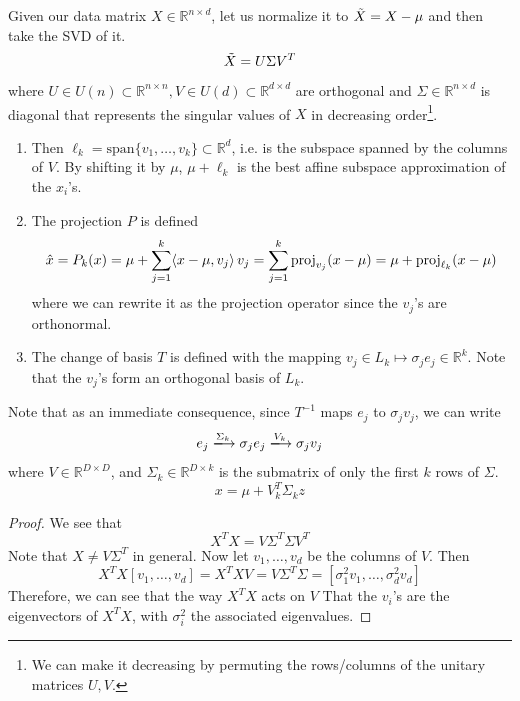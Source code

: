     \begin{theorem}
      Given our data matrix $X \in \mathbb{R}^{n \times d}$, let us normalize it to $\Tilde{X} = X - \mu$ and then take the SVD of it. 
      \begin{equation}
        \Tilde{X} = U \Sigma V^T
      \end{equation}
      where $U \in U(n) \subset \mathbb{R}^{n \times n}, V \in U(d) \subset \mathbb{R}^{d \times d}$ are orthogonal and $\Sigma \in \mathbb{R}^{n \times d}$ is diagonal that represents the singular values of $X$ in decreasing order\footnote{We can make it decreasing by permuting the rows/columns of the unitary matrices $U, V$.}. 
      \begin{enumerate}
        \item Then $\ell_k = \mathrm{span}\{v_1, \ldots, v_k\} \subset \mathbb{R}^d$, i.e. is the subspace spanned by the columns of $V$. By shifting it by $\mu$, $\mu + \ell_k$ is the best affine subspace approximation of the $x_i$'s. 

        \item The projection $P$ is defined 
        \begin{equation}
          \hat{x} = P_k (x) = \mu + \sum_{j=1}^k \langle x - \mu, v_j \rangle \, v_j = \sum_{j=1}^k \operatorname{proj}_{v_j} (x - \mu) = \mu + \operatorname{proj}_{\ell_k} (x - \mu)
        \end{equation}
        where we can rewrite it as the projection operator since the $v_j$'s are orthonormal. 

        \item The change of basis $T$ is defined with the mapping $v_j \in L_k \mapsto \sigma_j e_j \in \mathbb{R}^k$. Note that the $v_j$'s form an orthogonal basis of $L_k$. 
      \end{enumerate} 
      Note that as an immediate consequence, since $T^{-1}$ maps $e_j$ to $\sigma_j v_j$, we can write 
      \begin{equation}
        e_j \xlongrightarrow{\Sigma_k} \sigma_j e_j \xlongrightarrow{V_k} \sigma_j v_j
      \end{equation}
      where $V \in \mathbb{R}^{D \times D}$, and $\Sigma_k \in \mathbb{R}^{D \times k}$ is the submatrix of only the first $k$ rows of $\Sigma$. 
      \begin{equation}
        x = \mu + V_k^T \Sigma_k z
      \end{equation}
    \end{theorem}
    \begin{proof}
      We see that 
      \begin{equation}
        X^T X =  V \Sigma^T \Sigma V^T
      \end{equation}
      Note that $X \neq V \Sigma^T$ in general. Now let $v_1, \ldots, v_d$ be the columns of $V$. Then 
      \begin{equation}
        X^T X [v_1, \ldots, v_d] = X^T X V = V \Sigma^T \Sigma = [\sigma_1^2 v_1, \ldots, \sigma_d^2 v_d]
      \end{equation}
      Therefore, we can see that the way $X^T X$ acts on $V$ That the $v_i$'s are the eigenvectors of $X^T X$, with $\sigma_i^2$ the associated eigenvalues. 
    \end{proof}

